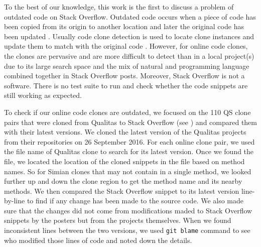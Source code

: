 \documentclass[sigconf,review, anonymous]{acmart}
\begin{document}

To the best of our knowledge, this work is the first to discuss a problem of outdated code on Stack Overflow. Outdated code occurs when a piece of code has been copied from its origin to another location and later the original code has been updated \cite{Xia2014}. Usually code clone detection is used to locate clone instances and update them to match with the original code \cite{Bellon2007}. However, for online code clones, the clones are pervasive and are more difficult to detect than in a local project(s) due to its large search space and the mix of natural and programming language combined together in Stack Overflow posts. Moreover, Stack Overflow is not a software. There is no test suite to run and check whether the code snippets are still working as expected.

To check if our online code clones are outdated, we focused on the 110 QS clone pairs that were cloned from Qualitas to Stack Overflow (see ) and compared them with their latest versions. We cloned the latest version of the Qualitas projects from their repositories on 26 September 2016. For each online clone pair, we used the file name of Qualitas clone to search for its latest version. Once we found the file, we located the location of the cloned snippets in the file based on method names. So for Simian clones that may not contain in a single method, we looked further up and down the clone region to get the method name and its nearby methods. We then compared the Stack Overflow snippet to its latest version line-by-line to find if any change has been made to the source code. We also made sure that the changes did not come from modifications maded to Stack Overflow snippets by the posters but from the projects themselves. When we found inconsistent lines between the two versions, we used \texttt{git blame} command to see who modified those lines of code and noted down the details.
\end{document}
